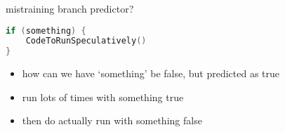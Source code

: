 \begin{frame}[fragile]{mistraining branch predictor?}
\begin{lstlisting}[language=C]
if (something) {
    CodeToRunSpeculatively()
}
\end{lstlisting}
\begin{itemize}
\item how can we have `something' be false, but predicted
    as true
\vspace{.5cm}
\item run lots of times with something true
\item then do actually run with something false
\end{itemize}
\end{frame}

